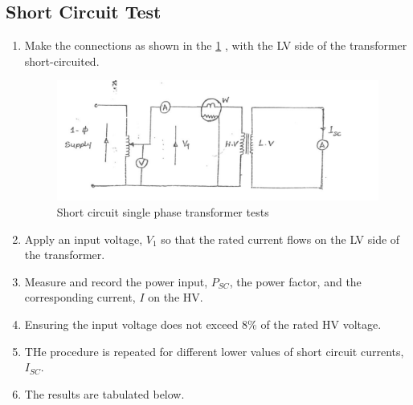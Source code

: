 \documentclass[12pt,a4paper]{report}
\begin{document}
\subsection{Short Circuit Test}
\begin{enumerate}
    \item Make the connections as shown in the \ref{fig_4} , with the LV side of the transformer short-circuited.
    \begin{figure}[H]
        \centering
        \includegraphics[width=0.8\linewidth]{figure_4_4.jpeg}
        \caption{Short circuit single phase transformer tests}
        \label{fig_4}
    \end{figure}
    \item Apply an input voltage, $V_{1}$ so that the rated current flows on the LV side of the transformer.
    \item Measure and record the power input, $P_{SC}$, the power factor, and the corresponding current, $I$ on the HV.
    \item Ensuring the input voltage does not exceed 8\% of the rated HV voltage.
    \item THe procedure is repeated for different lower values of short circuit currents, $I_{SC}$.
    \item The results are tabulated below.



\end{enumerate}
\end{document}
